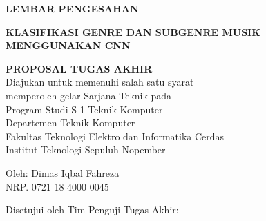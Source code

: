 \begin{center}
	\large
  \textbf{LEMBAR PENGESAHAN}
\end{center}

\thispagestyle{empty}

\begin{center}
  \textbf{KLASIFIKASI GENRE DAN SUBGENRE MUSIK MENGGUNAKAN CNN}
\end{center}

\begingroup
  \small
  
  \vspace{3ex}

  \begin{center}
    \textbf{PROPOSAL TUGAS AKHIR}
    \\Diajukan untuk memenuhi salah satu syarat
    \\memperoleh gelar Sarjana Teknik pada
    \\Program Studi S-1 Teknik Komputer
    \\Departemen Teknik Komputer
    \\Fakultas Teknologi Elektro dan Informatika Cerdas
    \\Institut Teknologi Sepuluh Nopember
  \end{center}

  \vspace{3ex}

  \begin{center}
    Oleh: Dimas Iqbal Fahreza
    \\NRP. 0721 18 4000 0045
  \end{center}

  \vspace{3ex}


  \begin{center}
    Disetujui oleh Tim Penguji Tugas Akhir:
  \end{center}

  \vspace{4ex}

  \begingroup
    \setlength{\tabcolsep}{0pt}

